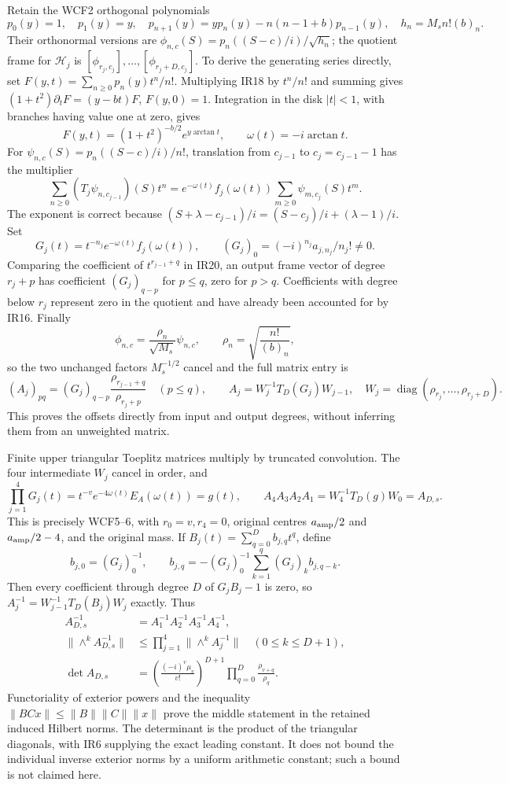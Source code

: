 \documentclass[11pt]{article}
\newcommand{\diag}{\operatorname{diag}}
\begin{document}
Retain the WCF2 orthogonal polynomials
\[
 p_0(y)=1,\quad p_1(y)=y,\quad
 p_{n+1}(y)=yp_n(y)-n(n-1+b)p_{n-1}(y),
 \quad h_n=M_s n!(b)_n.
 \tag{IR18}
\]
Their orthonormal versions are
$\phi_{n,c}(S)=p_n((S-c)/i)/\sqrt{h_n}$; the quotient frame
for $\mathcal H_j$ is $[\phi_{r_j,c_j}],\ldots,[\phi_{r_j+D,c_j}]$.
To derive the generating series directly, set
$F(y,t)=\sum_{n\ge0}p_n(y)t^n/n!$. Multiplying IR18 by
$t^n/n!$ and summing gives
$(1+t^2)\partial_tF=(y-bt)F$, $F(y,0)=1$.
Integration in the disk $|t|<1$, with branches having value one
at zero, gives
\[
 F(y,t)=(1+t^2)^{-b/2}e^{y\arctan t},\qquad
 \omega(t)=-i\arctan t.
 \tag{IR19}
\]
For $\psi_{n,c}(S)=p_n((S-c)/i)/n!$, translation from $c_{j-1}$
to $c_j=c_{j-1}-1$ has the multiplier
\[
 \sum_{n\ge0}(T_j\psi_{n,c_{j-1}})(S)t^n
 = e^{-\omega(t)}f_j(\omega(t))
   \sum_{m\ge0}\psi_{m,c_j}(S)t^m.
 \tag{IR20}
\]
The exponent is correct because
$(S+\lambda-c_{j-1})/i=(S-c_j)/i+(\lambda-1)/i$.
Set
\[
 G_j(t)=t^{-n_j}e^{-\omega(t)}f_j(\omega(t)),\qquad
 (G_j)_0=(-i)^{n_j}a_{j,n_j}/n_j!\ne0.
 \tag{IR21}
\]
Comparing the coefficient of $t^{r_{j-1}+q}$ in IR20, an output
frame vector of degree $r_j+p$ has coefficient
$(G_j)_{q-p}$ for $p\le q$, zero for $p>q$. Coefficients with
degree below $r_j$ represent zero in the quotient and have already
been accounted for by IR16. Finally
\[
 \phi_{n,c}=\frac{\rho_n}{\sqrt{M_s}}\psi_{n,c},\qquad
 \rho_n=\sqrt{\frac{n!}{(b)_n}},
\]
so the two unchanged factors $M_s^{-1/2}$ cancel and the full
matrix entry is
\[
 (A_j)_{pq}=(G_j)_{q-p}\frac{\rho_{r_{j-1}+q}}{\rho_{r_j+p}}
 \quad(p\le q),\qquad
 A_j=W_j^{-1}T_D(G_j)W_{j-1},\quad
 W_j=\diag(\rho_{r_j},\ldots,\rho_{r_j+D}).
 \tag{IR22}
\]
This proves the offsets directly from input and output degrees,
without inferring them from an unweighted matrix.

Finite upper triangular Toeplitz matrices multiply by truncated
convolution. The four intermediate $W_j$ cancel in order, and
\[
 \prod_{j=1}^4G_j(t)=t^{-v}e^{-4\omega(t)}E_A(\omega(t))=g(t),
 \qquad A_4A_3A_2A_1=W_4^{-1}T_D(g)W_0=A_{D,s}.
 \tag{IR23}
\]
This is precisely WCF5--6, with $r_0=v,r_4=0$, original centres
$a_{\rm amp}/2$ and $a_{\rm amp}/2-4$, and the original mass.
If $B_j(t)=\sum_{q=0}^D b_{j,q}t^q$, define
\[
 b_{j,0}=(G_j)_0^{-1},\qquad
 b_{j,q}=-(G_j)_0^{-1}\sum_{k=1}^q(G_j)_k b_{j,q-k}.
 \tag{IR24}
\]
Then every coefficient through degree $D$ of $G_jB_j-1$ is zero,
so $A_j^{-1}=W_{j-1}^{-1}T_D(B_j)W_j$ exactly. Thus
\[
 \begin{split}
 A_{D,s}^{-1}&=A_1^{-1}A_2^{-1}A_3^{-1}A_4^{-1},\\
 \|\wedge^k A_{D,s}^{-1}\|&\le
       \prod_{j=1}^4\|\wedge^k A_j^{-1}\|\quad(0\le k\le D+1),\\
 \det A_{D,s}&=
 \left(\frac{(-i)^v\mu_v}{v!}\right)^{D+1}
 \prod_{q=0}^D\frac{\rho_{v+q}}{\rho_q}.
 \end{split}\tag{IR25}
\]
Functoriality of exterior powers and the inequality
$\|BCx\|\le\|B\|\|C\|\|x\|$ prove the middle statement in
the retained induced Hilbert norms. The determinant is the product
of the triangular diagonals, with IR6 supplying the exact leading
constant. It does not bound the individual inverse exterior norms
by a uniform arithmetic constant; such a bound is not claimed here.
\end{document}
